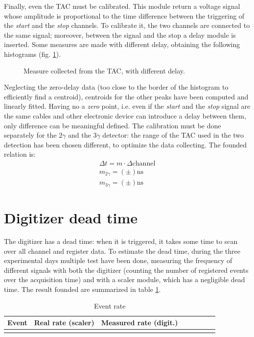 \documentclass[11pt,a4 paper]{article}
\begin{document}
Finally, even the TAC must be calibrated. This module return a voltage signal whose amplitude is proportional to the time difference between the triggering of the \emph{start} and the \emph{stop} channels. To calibrate it, the two channels are connected to the same signal; moreover, between the signal and the stop a delay module is inserted. Some measures are made with different delay, obtaining the following histograms (fig. \ref{fig:tachisto}).

\begin{figure}[H]
    \centering
    \caption{Measure collected from the TAC, with different delay.}
    \label{fig:tachisto}
\end{figure}

Neglecting the zero-delay data (too close to the border of the histogram to efficiently find a centroid), centroids for the other peaks have been computed and linearly fitted. Having no a \emph{zero} point, i.e. even if the \emph{start} and the \emph{stop} signal are the same cables and other electronic device can introduce a delay between them, only difference can be meaningful defined. The calibration must be done separately for the $2\gamma$ and the $3\gamma$ detector: the range of the TAC used in the two detection has been chosen different, to optimize the data collecting. The founded relation is:
\begin{gather*}
    \Delta t = m \cdot \Delta\text{channel} \\
    m_{2\gamma} = ( \pm )\si{\nano\second} \\
    m_{3\gamma} = ( \pm )\si{\nano\second}
\end{gather*}

\section{Digitizer dead time}
The digitizer has a dead time: when it is triggered, it takes some time to scan over all channel and register data. To estimate the dead time, during the three experimental days multiple test have been done, measuring the frequency of different signals with both the digitizer (counting the number of registered events over the acquisition time) and with a scaler module, which has a negligible dead time. The result founded are summarized in table \ref{tab:rate}.

\begin{table}[H]
    \centering
    \begin{tabular}{cccccccc}
        \toprule
        Event & Real rate (scaler) & Measured rate (digit.) \\
        \midrule
         \\
        \bottomrule
    \end{tabular}
    \caption{Event rate}
    \label{tab:rate}
\end{table}
\end{document}
